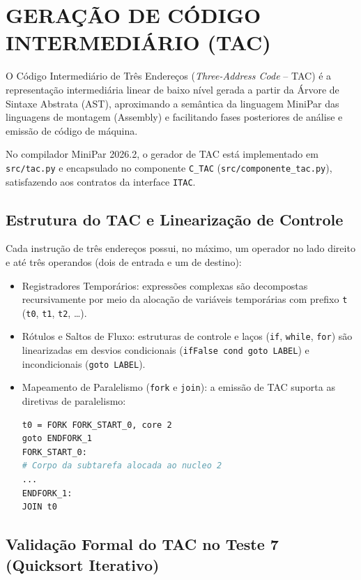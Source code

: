 \chapter{GERAÇÃO DE CÓDIGO INTERMEDIÁRIO (TAC)}

O Código Intermediário de Três Endereços (\textit{Three-Address Code} -- TAC) é a representação intermediária linear de baixo nível gerada a partir da Árvore de Sintaxe Abstrata (AST), aproximando a semântica da linguagem MiniPar das linguagens de montagem (Assembly) e facilitando fases posteriores de análise e emissão de código de máquina.

No compilador MiniPar 2026.2, o gerador de TAC está implementado em \texttt{src/tac.py} e encapsulado no componente \texttt{C\_TAC} (\texttt{src/componente\_tac.py}), satisfazendo aos contratos da interface \texttt{ITAC}.

\section{Estrutura do TAC e Linearização de Controle}

Cada instrução de três endereços possui, no máximo, um operador no lado direito e até três operandos (dois de entrada e um de destino):
\begin{itemize}
    \item Registradores Temporários: expressões complexas são decompostas recursivamente por meio da alocação de variáveis temporárias com prefixo \texttt{t} (\texttt{t0}, \texttt{t1}, \texttt{t2}, \dots).
    \item Rótulos e Saltos de Fluxo: estruturas de controle e laços (\texttt{if}, \texttt{while}, \texttt{for}) são linearizadas em desvios condicionais (\texttt{ifFalse cond goto LABEL}) e incondicionais (\texttt{goto LABEL}).
    \item Mapeamento de Paralelismo (\texttt{fork} e \texttt{join}):
    a emissão de TAC suporta as diretivas de paralelismo:
    \begin{lstlisting}[language=bash]
t0 = FORK FORK_START_0, core 2
goto ENDFORK_1
FORK_START_0:
# Corpo da subtarefa alocada ao nucleo 2
...
ENDFORK_1:
JOIN t0
    \end{lstlisting}
\end{itemize}

\section{Validação Formal do TAC no Teste 7 (Quicksort Iterativo)}

